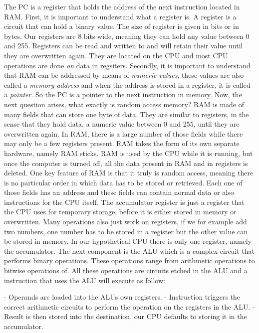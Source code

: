 The PC is a register that holds the address of the next instruction located in RAM.
First, it is important to understand what a register is. A register is a circuit
that can hold a binary value. The size of register is given in bits or in bytes. Our
registers are 8 bits wide, meaning they can hold any value between 0 and 255. 
Registers can be read and written to and will retain their value until they are
overwritten again. They are located on the CPU and most CPU operations are done \textit{on}
data in regsiters. \newline
Secondly, it is important to understand that RAM can be addressed by means of \textit{numeric
values}, these values are also called a \textit{memory address} and when the address is stored
in a register, it is called a \textit{pointer}. So the PC is a pointer to the next instruction
in memory. \newline
Now, the next question arises, what exactly is random access memory? RAM is made of many fields 
that can store one byte of data. They are similar to registers, in the sense that they hold data, a numeric
value between 0 and 255, until they are overwritten again. In RAM, there is a large number of
those fields while there may only be a few registers present. RAM takes the form of its
own separate hardware, namely RAM sticks. RAM is used by the CPU while it is running, but
once the computer is turned off, all the data present in RAM and in registers is deleted.
One key feature of RAM is that it truly is random access, meaning there is no particular order
in which data has to be stored or retrieved. Each one of those fields has an address and
these fields can contain normal data or also instructions for the CPU itself.\newline
The accumulator register is just a register that the CPU uses for temporary storage, before
it is either stored in memory or overwritten. Many operations also just work on registers,
if we for example add two numbers, one number has to be stored in a register but the other
value can be stored in memory. In our hypothetical CPU there is only one register, namely
the accumulator.\newline
The next component is the ALU which is a complex circuit that performs binary operations.
These operations range from arithmetic operations to bitwise operations of. All these
operations are circuits etched in the ALU and a instruction that uses
the ALU will execute as follow:

- Operands are loaded into the ALUs own registers.
- Instruction triggers the correct arithmetic circuits to perform the operation on the registers in the ALU.
- Result is then stored into the destination, our CPU defaults to storing it in the accumulator.


